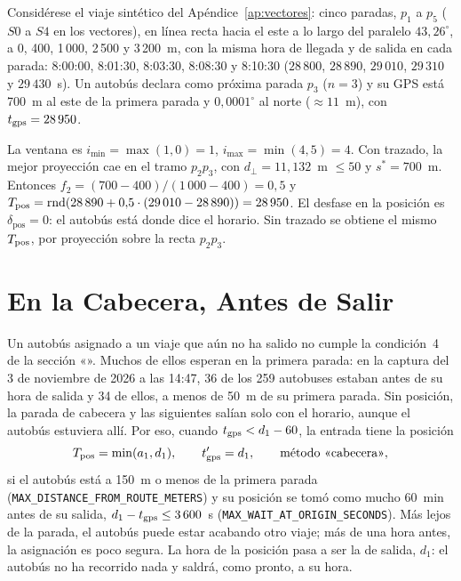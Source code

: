 \begin{ejemplo}
\label{ej:posicion}
Considérese el viaje sintético del Apéndice~\ref{ap:vectores}: cinco paradas, $p_1$ a $p_5$ ($S0$ a $S4$ en
los vectores), en línea recta hacia el este a lo largo del paralelo $43{,}26^\circ$, a 0, 400, 1\,000,
2\,500 y 3\,200~m, con la misma hora de llegada y de salida en cada parada: 8:00:00, 8:01:30, 8:03:30, 8:08:30 y
8:10:30 ($28\,800$, $28\,890$, $29\,010$, $29\,310$ y $29\,430$~s). Un autobús declara como próxima parada $p_3$
($n=3$) y su GPS está 700~m al este de la primera parada y $0{,}0001^\circ$ al norte ($\approx11$~m), con
$t_{\mathrm{gps}}=28\,950$.

La ventana es $i_{\min}=\max(1,0)=1$, $i_{\max}=\min(4,5)=4$. Con trazado, la mejor proyección cae en el tramo
$p_2p_3$, con $d_\perp=11{,}132$~m $\le50$ y $s^\ast=700$~m. Entonces $f_2=(700-400)/(1\,000-400)=0{,}5$ y
$T_{\mathrm{pos}}=\operatorname{rnd}(28\,890+0{,}5\cdot(29\,010-28\,890))=28\,950$. El desfase en la posición es
$\delta_{\mathrm{pos}}=0$: el autobús está donde dice el horario. Sin trazado se obtiene el mismo $T_{\mathrm{pos}}$, por
proyección sobre la recta $p_2p_3$.
\end{ejemplo}

\section{En la Cabecera, Antes de Salir}
\label{sec:cabecera}

Un autobús asignado a un viaje que aún no ha salido no cumple la condición~4 de la sección
«». Muchos de ellos esperan en la primera parada: en la captura del 3 de noviembre de 2026
a las 14:47, 36 de los 259 autobuses estaban antes de su hora de salida y 34 de ellos, a menos de 50~m de su primera
parada. Sin posición, la parada de cabecera y las siguientes salían solo con el horario, aunque el autobús estuviera
allí. Por eso, cuando $t_{\mathrm{gps}}<d_1-60$, la entrada tiene la posición
\begin{equation}
\label{eq:cabecera}
T_{\mathrm{pos}}=\min(a_1,d_1),\qquad t_{\mathrm{gps}}'=d_1,\qquad\text{método «cabecera»},
\end{equation}
si el autobús está a 150~m o menos de la primera parada (\texttt{MAX\_DISTANCE\_FROM\_ROUTE\_METERS}) y su posición
se tomó como mucho 60~min antes de su salida, $d_1-t_{\mathrm{gps}}\le3\,600$~s (\texttt{MAX\_WAIT\_AT\_ORIGIN\_SECONDS}). Más
lejos de la parada, el autobús puede estar acabando otro viaje; más de una hora antes, la asignación es poco segura. La
hora de la posición pasa a ser la de salida, $d_1$: el autobús no ha recorrido nada y saldrá, como pronto, a su hora.

